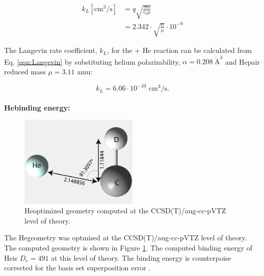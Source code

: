\begin{equation}
    \begin{split}
        k_L [\text{cm}^3 / \text{s}] & = q \sqrt{\frac{\pi \alpha}{\epsilon _0 \mu}} \\
        &= 2.342 \cdot \sqrt{ \frac{\alpha}{\mu}} \cdot 10^{-9} 
   \end{split}
   \label{eqn:Langevin}
\end{equation}


The Langevin rate coefficient, $k_L$, for the \CD + He reaction can be calculated from Eq. \ref{eqn:Langevin} by substituting helium polarizability, $\alpha=0.208\  \mathring{\text{A}}^3$ \cite{olney_absolute_1997} and He\CD pair reduced mass $\mu=3.11$ amu:

\begin{equation}
        k_L = 6.06 \cdot 10^{-10} \text{ cm}^3 / \text{s}.
   \label{eqn:Langevin-CD+}
\end{equation}
\\
\textbf{He\CD binding energy:}\label{discussions:binding-energy:CD+}\\

\begin{figure}[!htb]
    \centering
    \includegraphics[width=0.5\textwidth]{figures/measurements/kinetics/HeCD+_geometry.pdf}
    \caption{He\CD optimized geometry computed at the CCSD(T)/aug-cc-pVTZ level of theory.}
    \label{fig:HeCD_geometry}
\end{figure}

The He\CD geometry was optmised at the CCSD(T)/aug-cc-pVTZ level of theory. The computed geometry is shown in Figure \ref{fig:HeCD_geometry}. The computed binding energy of He\CD is $D_e=491$ \wnn at this level of theory. The binding energy is counterpoise corrected for the basis set superposition error \cite{boys_calculation_1970}.




